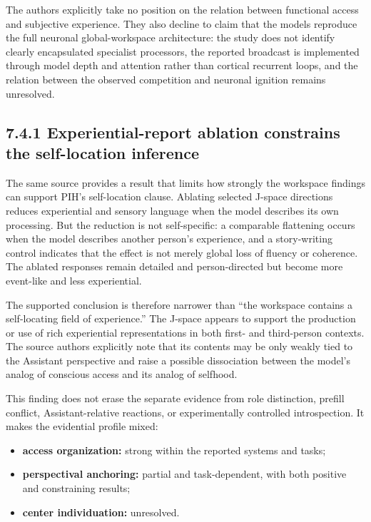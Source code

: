 \documentclass[
  11pt,
]{article}
\providecommand{\tightlist}{%
  \setlength{\itemsep}{0pt}\setlength{\parskip}{0pt}}
\begin{document}
The authors explicitly take no position on the relation between
functional access and subjective experience. They also decline to claim
that the models reproduce the full neuronal global-workspace
architecture: the study does not identify clearly encapsulated
specialist processors, the reported broadcast is implemented through
model depth and attention rather than cortical recurrent loops, and the
relation between the observed competition and neuronal ignition remains
unresolved.

\subsection{7.4.1 Experiential-report ablation constrains the
self-location
inference}\label{experiential-report-ablation-constrains-the-self-location-inference}

The same source provides a result that limits how strongly the workspace
findings can support PIH's self-location clause. Ablating selected
J-space directions reduces experiential and sensory language when the
model describes its own processing. But the reduction is not
self-specific: a comparable flattening occurs when the model describes
another person's experience, and a story-writing control indicates that
the effect is not merely global loss of fluency or coherence. The
ablated responses remain detailed and person-directed but become more
event-like and less experiential.

The supported conclusion is therefore narrower than ``the workspace
contains a self-locating field of experience.'' The J-space appears to
support the production or use of rich experiential representations in
both first- and third-person contexts. The source authors explicitly
note that its contents may be only weakly tied to the Assistant
perspective and raise a possible dissociation between the model's analog
of conscious access and its analog of selfhood.

This finding does not erase the separate evidence from role distinction,
prefill conflict, Assistant-relative reactions, or experimentally
controlled introspection. It makes the evidential profile mixed:

\begin{itemize}
\tightlist
\item
  \textbf{access organization:} strong within the reported systems and
  tasks;
\item
  \textbf{perspectival anchoring:} partial and task-dependent, with both
  positive and constraining results;
\item
  \textbf{center individuation:} unresolved.
\end{itemize}
\end{document}
